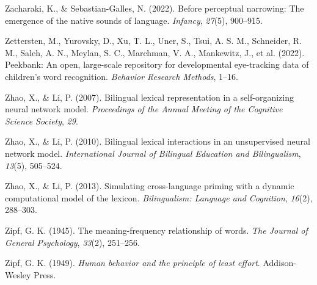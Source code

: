 \documentclass[
  12pt,
  b5paperpaper,
  twoside]{scrreprt}
\newlength{\cslhangindent}
\newlength{\cslentryspacingunit} %
\newenvironment{CSLReferences}[2] %
 {%
  \setlength{\parindent}{0pt}
  \ifodd #1
  \let\oldpar\par
  \def\par{\hangindent=\cslhangindent\oldpar}
  \fi
  \setlength{\parskip}{#2\cslentryspacingunit}
 }%
 {}
\begin{document}
\begin{CSLReferences}{1}{0}
\leavevmode{}%
Zacharaki, K., \& Sebastian-Galles, N. (2022). Before perceptual
narrowing: The emergence of the native sounds of language.
\emph{Infancy}, \emph{27}(5), 900--915.

\leavevmode{}%
Zettersten, M., Yurovsky, D., Xu, T. L., Uner, S., Tsui, A. S. M.,
Schneider, R. M., Saleh, A. N., Meylan, S. C., Marchman, V. A.,
Mankewitz, J., et al. (2022). Peekbank: An open, large-scale repository
for developmental eye-tracking data of children's word recognition.
\emph{Behavior Research Methods}, 1--16.

\leavevmode{}%
Zhao, X., \& Li, P. (2007). Bilingual lexical representation in a
self-organizing neural network model. \emph{Proceedings of the Annual
Meeting of the Cognitive Science Society}, \emph{29}.

\leavevmode{}%
Zhao, X., \& Li, P. (2010). Bilingual lexical interactions in an
unsupervised neural network model. \emph{International Journal of
Bilingual Education and Bilingualism}, \emph{13}(5), 505--524.

\leavevmode{}%
Zhao, X., \& Li, P. (2013). Simulating cross-language priming with a
dynamic computational model of the lexicon. \emph{Bilingualism: Language
and Cognition}, \emph{16}(2), 288--303.

\leavevmode{}%
Zipf, G. K. (1945). The meaning-frequency relationship of words.
\emph{The Journal of General Psychology}, \emph{33}(2), 251--256.

\leavevmode{}%
Zipf, G. K. (1949). \emph{Human behavior and the principle of least
effort}. Addison-Wesley Press.

\end{CSLReferences}

\endgroup
\end{document}
